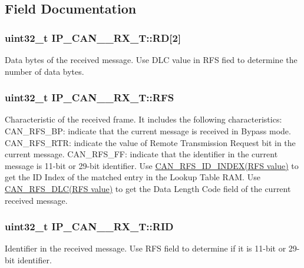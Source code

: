\subsection{Field Documentation}
\hypertarget{structIP__CAN__001__RX__T_a7b9fd4220efbbd69d33c81d887803b69}{
\subsubsection[{R\-D}]{ uint32\-\_\-t I\-P\-\_\-\-C\-A\-N\-\_\-\_\-\-R\-X\-\_\-\-T\-::\-R\-D\mbox{[}2\mbox{]}}}\label{structIP__CAN__001__RX__T_a7b9fd4220efbbd69d33c81d887803b69}
Data bytes of the received message. Use D\-L\-C value in R\-F\-S fied to determine the number of data bytes. \hypertarget{structIP__CAN__001__RX__T_aa5c1bc243bb1763d92e9070d84b594cf}{
\subsubsection[{R\-F\-S}]{ uint32\-\_\-t I\-P\-\_\-\-C\-A\-N\-\_\-\_\-\-R\-X\-\_\-\-T\-::\-R\-F\-S}}\label{structIP__CAN__001__RX__T_aa5c1bc243bb1763d92e9070d84b594cf}
Characteristic of the received frame. It includes the following characteristics\-: C\-A\-N\-\_\-\-R\-F\-S\-\_\-\-B\-P\-: indicate that the current message is received in Bypass mode. C\-A\-N\-\_\-\-R\-F\-S\-\_\-\-R\-T\-R\-: indicate the value of Remote Transmission Request bit in the current message. C\-A\-N\-\_\-\-R\-F\-S\-\_\-\-F\-F\-: indicate that the identifier in the current message is 11-\/bit or 29-\/bit identifier. Use \hyperlink{group__CAN__17XX__40XX_gac392aec22ad3737b7750bb77e173fb72}{C\-A\-N\-\_\-\-R\-F\-S\-\_\-\-I\-D\-\_\-\-I\-N\-D\-E\-X(\-R\-F\-S value)} to get the I\-D Index of the matched entry in the Lookup Table R\-A\-M. Use \hyperlink{group__CAN__17XX__40XX_ga972eeafea01ef8b32a2209a526f07f27}{C\-A\-N\-\_\-\-R\-F\-S\-\_\-\-D\-L\-C(\-R\-F\-S value)} to get the Data Length Code field of the current received message. \hypertarget{structIP__CAN__001__RX__T_a9b8287992a2f69010823997db04d7ef6}{
\subsubsection[{R\-I\-D}]{ uint32\-\_\-t I\-P\-\_\-\-C\-A\-N\-\_\-\_\-\-R\-X\-\_\-\-T\-::\-R\-I\-D}}\label{structIP__CAN__001__RX__T_a9b8287992a2f69010823997db04d7ef6}
Identifier in the received message. Use R\-F\-S field to determine if it is 11-\/bit or 29-\/bit identifier. 

